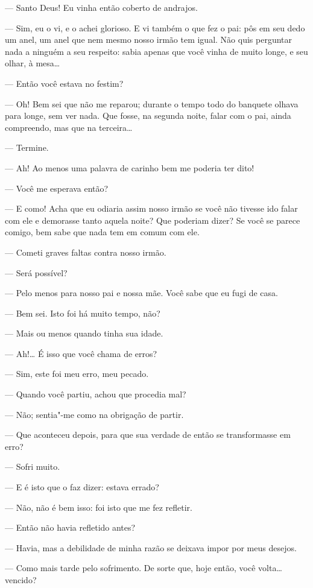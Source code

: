 --- Santo Deus! Eu vinha então coberto de andrajos.

--- Sim, eu o vi, e o achei glorioso. E vi também o que fez o pai: pôs em
seu dedo um anel, um anel que nem mesmo nosso irmão tem igual. Não quis
perguntar nada a ninguém a seu respeito: sabia apenas que você vinha de
muito longe, e seu olhar, à mesa\ldots{}

--- Então você estava no festim?

--- Oh! Bem sei que não me reparou; durante o tempo todo do banquete
olhava para longe, sem ver nada. Que fosse, na segunda noite, falar com
o pai, ainda compreendo, mas que na terceira\ldots{}

--- Termine.

--- Ah! Ao menos uma palavra de carinho bem me poderia ter dito!

--- Você me esperava então?

--- E como! Acha que eu odiaria assim nosso irmão se você não tivesse ido
falar com ele e demorasse tanto aquela noite? Que poderiam dizer? Se
você se parece comigo, bem sabe que nada tem em comum com ele.

--- Cometi graves faltas contra nosso irmão.

--- Será possível?

--- Pelo menos para nosso pai e nossa mãe. Você sabe que eu fugi de casa.

--- Bem sei. Isto foi há muito tempo, não?

--- Mais ou menos quando tinha sua idade.

--- Ah!\ldots{} É isso que você chama de erros?

--- Sim, este foi meu erro, meu pecado.

--- Quando você partiu, achou que procedia mal?

--- Não; sentia"-me como na obrigação de partir.

--- Que aconteceu depois, para que sua verdade de então se transformasse
em erro?

--- Sofri muito.

--- E é isto que o faz dizer: estava errado?

--- Não, não é bem isso: foi isto que me fez refletir.

--- Então não havia refletido antes?

--- Havia, mas a debilidade de minha razão se deixava impor por meus
desejos.

--- Como mais tarde pelo sofrimento. De sorte que, hoje então, você volta\ldots{} vencido?

